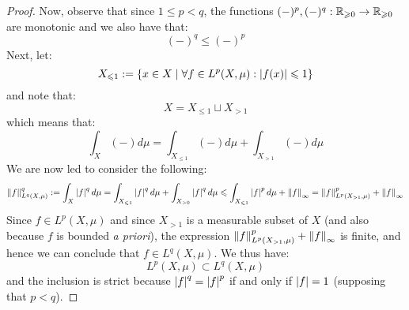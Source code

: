 \begin{proof}
                Now, observe that since $1 \leq p < q$, the functions $(-)^p, (-)^q: \mathbb{R}_{\geqslant 0} \to \mathbb{R}_{\geqslant 0}$ are monotonic and we also have that:
                    $$(-)^q \leq (-)^p$$
                Next, let:
                    $$X_{\leqslant 1} := \{ x \in X \mid \forall f \in L^p(X, \mu): \left\lvert {f(x)} \right\rvert \leqslant 1 \}$$
                and note that:
                    $$X = X_{\leq 1} \sqcup X_{> 1}$$
                which means that:
                    $$\int_X (-) d\mu = \int_{X_{\leq 1}} (-) d\mu + \int_{X_{> 1}} (-) d\mu$$
                We are now led to consider the following:
                    $$\left\| {f} \right\|_{L^q(X, \mu)}^q := \int_X \left\lvert {f} \right\rvert^q d\mu = \int_{X_{\leqslant 1}} \left\lvert {f} \right\rvert^q d\mu + \int_{X_{> 0}} \left\lvert {f} \right\rvert^q d\mu \leqslant \int_{X_{\leqslant 1}} \left\lvert {f} \right\rvert^p d\mu + \left\| {f} \right\|_{\infty} = \left\| {f} \right\|_{L^p(X_{> 1}, \mu)}^p + \left\| {f} \right\|_{\infty}$$
                Since $f \in L^p(X, \mu)$ and since $X_{> 1}$ is a measurable subset of $X$ (and also because $f$ is bounded \textit{a priori}), the expression $\left\| {f} \right\|_{L^p(X_{> 1}, \mu)}^p + \left\| {f} \right\|_{\infty}$ is finite, and hence we can conclude that $f \in L^q(X, \mu)$. We thus have:
                    $$L^p(X, \mu) \subset L^q(X, \mu)$$
                and the inclusion is strict because $\left\lvert {f} \right\rvert^q = \left\lvert {f} \right\rvert^p$ if and only if $\left\lvert {f} \right\rvert = 1$ (supposing that $p < q$).
            \end{proof}

